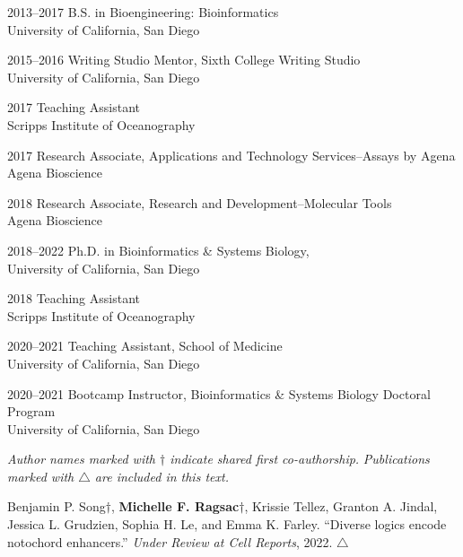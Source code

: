 \documentclass[11pt]{formatting-template}
\begin{document}
\begin{vita}
\noindent
\begin{cv}{}
\begin{cvlist}{}
	\item[2013--2017] B.S. in Bioengineering: Bioinformatics\\
		University of California, San Diego
	\item[2015--2016] Writing Studio Mentor, Sixth College Writing Studio\\
		University of California, San Diego
	\item[2017] Teaching Assistant\\Scripps Institute of Oceanography 
	\item[2017] Research Associate, Applications and Technology Services--Assays by Agena\\
		Agena Bioscience
	\item[2018] Research Associate, Research and Development--Molecular Tools\\
		Agena Bioscience 
	\item[2018--2022] Ph.D. in Bioinformatics \& Systems Biology,\\
		University of California, San Diego
	\item[2018] Teaching Assistant\\
		Scripps Institute of Oceanography
	\item[2020--2021] Teaching Assistant, School of Medicine\\
		University of California, San Diego 
	\item[2020--2021] Bootcamp Instructor, Bioinformatics \& Systems Biology Doctoral Program\\
		University of California, San Diego 
\end{cvlist}
\end{cv}

\publications{}

\noindent \textit{Author names marked with $\dagger$ indicate shared first co-authorship.} 
\noindent \textit{Publications marked with $\triangle$ are included in this text.} \newline

\noindent Benjamin P. Song$\dagger$, \textbf{Michelle F. Ragsac}$\dagger$, Krissie Tellez, Granton A. Jindal, Jessica L. Grudzien, Sophia H. Le, and Emma K. Farley. ``Diverse logics encode notochord enhancers.'' \textit{Under Review at Cell Reports}, 2022. $\triangle$ \newline


\end{vita}
\end{document}
